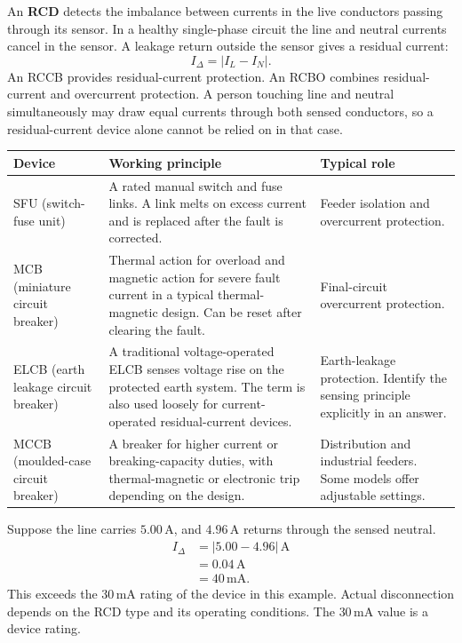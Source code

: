 \documentclass[12pt,a4paper]{article}
\begin{document}
An \textbf{RCD} detects the imbalance between currents in the live conductors passing through its sensor. In a healthy single-phase circuit the line and neutral currents cancel in the sensor. A leakage return outside the sensor gives a residual current:
\[
I_{\Delta}=\lvert I_L-I_N\rvert .
\]
An RCCB provides residual-current protection. An RCBO combines residual-current and overcurrent protection. A person touching line and neutral simultaneously may draw equal currents through both sensed conductors, so a residual-current device alone cannot be relied on in that case.

\par\vspace{6pt}\noindent
\begin{tabularx}{\linewidth}{|B{3.0cm}|Y|Y|}\hline
Device & \textbf{Working principle} & \textbf{Typical role} \\ \hline
SFU (switch-fuse unit) & A rated manual switch and fuse links. A link melts on excess current and is replaced after the fault is corrected. & Feeder isolation and overcurrent protection. \\ \hline
MCB (miniature circuit breaker) & Thermal action for overload and magnetic action for severe fault current in a typical thermal-magnetic design. Can be reset after clearing the fault. & Final-circuit overcurrent protection. \\ \hline
ELCB (earth leakage circuit breaker) & A traditional voltage-operated ELCB senses voltage rise on the protected earth system. The term is also used loosely for current-operated residual-current devices. & Earth-leakage protection. Identify the sensing principle explicitly in an answer. \\ \hline
MCCB (moulded-case circuit breaker) & A breaker for higher current or breaking-capacity duties, with thermal-magnetic or electronic trip depending on the design. & Distribution and industrial feeders. Some models offer adjustable settings. \\ \hline
\end{tabularx}

\begin{tcolorbox}[examplebox,title={Reading an RCD example}]
Suppose the line carries \(5.00\,\mathrm A\), and \(4.96\,\mathrm A\) returns through the sensed neutral.
\[
\begin{aligned}
I_\Delta &= \lvert 5.00-4.96\rvert\,\mathrm A\\
         &= 0.04\,\mathrm A\\
         &= 40\,\mathrm{mA}.
\end{aligned}
\]
This exceeds the \(30\,\mathrm{mA}\) rating of the device in this example. Actual disconnection depends on the RCD type and its operating conditions. The \(30\,\mathrm{mA}\) value is a device rating.
\end{tcolorbox}
\end{document}

